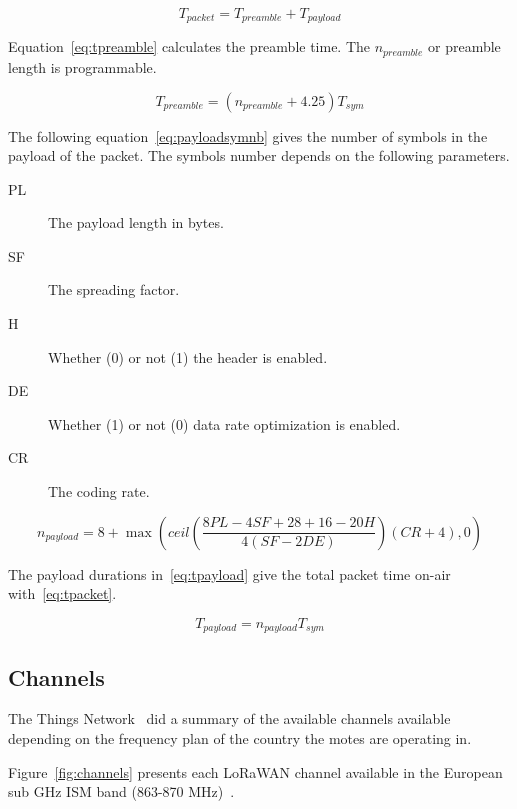 \begin{equation}
  \label{eq:tpacket}
  T_{packet} = T_{preamble} + T_{payload}
\end{equation}

Equation~\ref{eq:tpreamble} calculates the preamble time. The $n_{preamble}$
or preamble length is programmable.

\begin{equation}
  \label{eq:tpreamble}
  T_{preamble} = (n_{preamble} + 4.25)T_{sym}
\end{equation}

The following equation~\ref{eq:payloadsymnb} gives the number of symbols in the
payload of the packet.
The symbols number depends on the following parameters.

\begin{description}
  \item[PL] The payload length in bytes.
  \item[SF] The spreading factor.
  \item[H] Whether (0) or not (1) the header is enabled.
  \item[DE] Whether (1) or not (0) data rate optimization is enabled.
  \item[CR] The coding rate.
\end{description}

\begin{equation}
  \label{eq:payloadsymnb}
  n_{payload} = 8 + \max(ceil(\frac{8PL - 4SF + 28 + 16 - 20H}{4(SF - 2DE)})(CR + 4),0)
\end{equation}

The payload durations in~\ref{eq:tpayload} give the total packet time on-air
with~\ref{eq:tpacket}.

\begin{equation}
  \label{eq:tpayload}
  T_{payload} = n_{payload} T_{sym}
\end{equation}


\subsection{Channels}

The Things Network~\cite{ttnfrequencyplans} did a summary of the available
channels available depending on the frequency plan of the country the motes are
operating in.

Figure~\ref{fig:channels} presents each LoRaWAN channel available in the
European sub GHz ISM band (863-870 MHz)~\cite{Polonelli_2019}.

